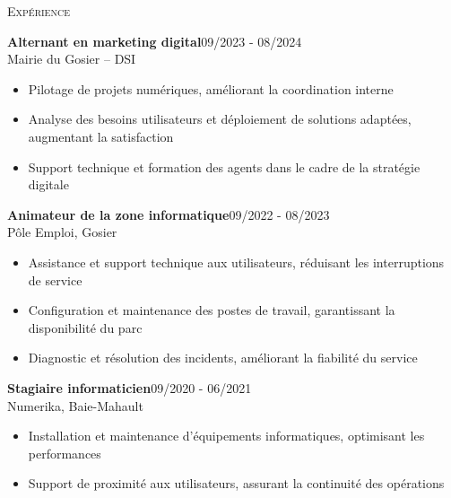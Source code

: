 \documentclass[11pt,a4paper]{article}
\newcommand{\headright}[1]{\vspace*{2.5ex}\textsc{\Large\color{cvblue}#1}\par%
  \vspace*{-2ex}{\color{cvblue}\hrulefill}\par}
\begin{document}
\begin{minipage}[t]{0.56\textwidth}
  \setlength{\parskip}{0.8ex}
  \vspace{2ex}

  \headright{Expérience}
  \colorbox{maincolor}{%
  \begin{minipage}{\linewidth}
    \noindent
    \textbf{Alternant en marketing digital}\hfill 09/2023 - 08/2024\\
    Mairie du Gosier – DSI\\[-0.3em]
    \begin{itemize}[leftmargin=*]
      \item Pilotage de projets numériques, améliorant la coordination interne \item Analyse des besoins utilisateurs et déploiement de solutions adaptées, augmentant la satisfaction \item Support technique et formation des agents dans le cadre de la stratégie digitale
    \end{itemize}
  \end{minipage}}

\vspace{3mm}

\colorbox{maincolor}{%
  \begin{minipage}{\linewidth}
    \noindent
    \textbf{Animateur de la zone informatique}\hfill 09/2022 - 08/2023\\
    Pôle Emploi, Gosier\\[-0.3em]
    \begin{itemize}[leftmargin=*]
      \item Assistance et support technique aux utilisateurs, réduisant les interruptions de service \item Configuration et maintenance des postes de travail, garantissant la disponibilité du parc \item Diagnostic et résolution des incidents, améliorant la fiabilité du service
    \end{itemize}
  \end{minipage}}

\vspace{3mm}

\colorbox{maincolor}{%
  \begin{minipage}{\linewidth}
    \noindent
    \textbf{Stagiaire informaticien}\hfill 09/2020 - 06/2021\\
    Numerika, Baie-Mahault\\[-0.3em]
    \begin{itemize}[leftmargin=*]
      \item Installation et maintenance d’équipements informatiques, optimisant les performances \item Support de proximité aux utilisateurs, assurant la continuité des opérations
    \end{itemize}
  \end{minipage}}        %


\end{minipage}
\end{document}
